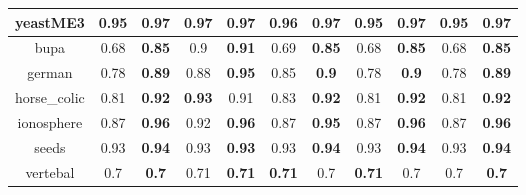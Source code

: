 \documentclass{article}%
\begin{document}
\begin{tabular}{c|cccccccccc}
\hline%
yeastME3&0.95&\textbf{0.97}&0.97&\textbf{0.97}&0.96&\textbf{0.97}&0.95&\textbf{0.97}&0.95&\textbf{0.97}\\%
\hline%
bupa&0.68&\textbf{0.85}&0.9&\textbf{0.91}&0.69&\textbf{0.85}&0.68&\textbf{0.85}&0.68&\textbf{0.85}\\%
\hline%
german&0.78&\textbf{0.89}&0.88&\textbf{0.95}&0.85&\textbf{0.9}&0.78&\textbf{0.9}&0.78&\textbf{0.89}\\%
\hline%
horse\_colic&0.81&\textbf{0.92}&\textbf{0.93}&0.91&0.83&\textbf{0.92}&0.81&\textbf{0.92}&0.81&\textbf{0.92}\\%
\hline%
ionosphere&0.87&\textbf{0.96}&0.92&\textbf{0.96}&0.87&\textbf{0.95}&0.87&\textbf{0.96}&0.87&\textbf{0.96}\\%
\hline%
seeds&0.93&\textbf{0.94}&0.93&\textbf{0.93}&0.93&\textbf{0.94}&0.93&\textbf{0.94}&0.93&\textbf{0.94}\\%
\hline%
vertebal&0.7&\textbf{0.7}&0.71&\textbf{0.71}&\textbf{0.71}&0.7&\textbf{0.71}&0.7&0.7&\textbf{0.7}\\%
\hline%
\end{tabular}

%
\end{document}
